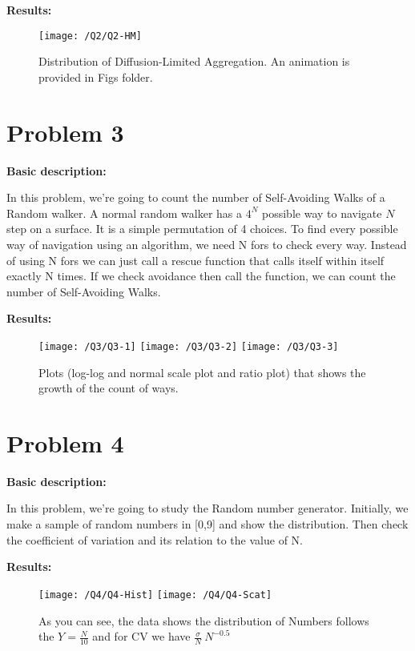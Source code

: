 \documentclass{article}
\begin{document}
    \textbf{Results:}

    \begin{figure}[!htb]
        \centering
        \texttt{[image: /Q2/Q2-HM]}
        \label{fig:2.1}
        \caption{Distribution of Diffusion-Limited Aggregation. An animation is provided in Figs folder.}
    \end{figure}

    \pagebreak

    \section*{Problem 3}
    \textbf{Basic description:}

    In this problem,
    we're going to count the number of Self-Avoiding Walks of a Random walker.
    A normal random walker has a $4^N$ possible way to navigate $N$ step on a surface.
    It is a simple permutation of 4 choices.
    To find every possible way of navigation using an algorithm,
    we need N fors to check every way.
    Instead of using N fors we can just call a rescue function
    that calls itself within itself exactly N times.
    If we check avoidance then call the function,
    we can count the number of Self-Avoiding Walks.
    
    \textbf{Results:}

    \begin{figure}[!htb]
        \centering
        \texttt{[image: /Q3/Q3-1]}
        \label{fig:3.1}
        \texttt{[image: /Q3/Q3-2]}
        \label{fig:3.2}
        \texttt{[image: /Q3/Q3-3]}
        \label{fig:3.3}
        \caption{Plots (log-log and normal scale plot and ratio plot) that shows the growth of the count of ways.}
    \end{figure}

    \pagebreak

    \section*{Problem 4}
    \textbf{Basic description:}

    In this problem, we're going to study the Random number generator.
    Initially, we make a sample of random numbers in [0,9] and show the distribution.
    Then check the coefficient of variation and its relation to the value of N.
    
    \textbf{Results:}

    \begin{figure}[!htb]
        \centering
        \texttt{[image: /Q4/Q4-Hist]}
        \label{fig:4.1}
        \texttt{[image: /Q4/Q4-Scat]}
        \label{fig:4.2}
        \caption{As you can see, the data shows the distribution of Numbers follows the $Y = \frac{N}{10}$ and for CV we have $\frac{\sigma}{N}~N^{-0.5}$}
    \end{figure}
\end{document}
